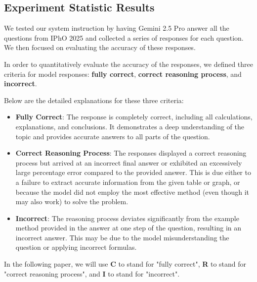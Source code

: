 \documentclass[12pt]{article}
\begin{document}
\subsection{Experiment Statistic Results}
We tested our system instruction by having Gemini 2.5 Pro answer all the questions from IPhO 2025 and collected a series of responses for each question. We then focused on evaluating the accuracy of these responses.

In order to quantitatively evaluate the accuracy of the responses, we defined three criteria for model responses: \textbf{fully correct}, \textbf{correct reasoning process}, and \textbf{incorrect}.

Below are the detailed explanations for these three criteria:

\begin{itemize}
    \item \textbf{Fully Correct}: The response is completely correct, including all calculations, explanations, and conclusions. It demonstrates a deep understanding of the topic and provides accurate answers to all parts of the question.
    \item \textbf{Correct Reasoning Process}: The responses displayed a correct reasoning process but arrived at an incorrect final answer or exhibited an excessively large percentage error compared to the provided answer. This is due either to a failure to extract accurate information from the given table or graph, or because the model did not employ the most effective method (even though it may also work) to solve the problem. 
    \item \textbf{Incorrect}: The reasoning process deviates significantly from the example method provided in the answer at one step of the question, resulting in an incorrect answer. This may be due to the model misunderstanding the question or applying incorrect formulas.
\end{itemize}
In the following paper, we will use \textbf{C} to stand for "fully correct", \textbf{R} to stand for "correct reasoning process", and \textbf{I} to stand for "incorrect".
\end{document}
